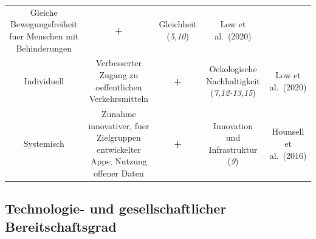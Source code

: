 \documentclass[
]{book}
\begin{document}
\begin{longtable}[]{@{}ccccc@{}}
\begin{minipage}[t]{0.16\columnwidth}
Gleiche Bewegungsfreiheit fuer Menschen mit Behinderungen\strut
\end{minipage} & \begin{minipage}[t]{0.17\columnwidth}\centering
\textbf{+}\strut
\end{minipage} & \begin{minipage}[t]{0.17\columnwidth}\centering
Gleichheit (\emph{5,10})\strut
\end{minipage} & \begin{minipage}[t]{0.17\columnwidth}\centering
Low et al.~(2020)\strut
\end{minipage}\tabularnewline
\begin{minipage}[t]{0.17\columnwidth}\centering
Individuell\strut
\end{minipage} & \begin{minipage}[t]{0.16\columnwidth}\centering
Verbesserter Zugang zu oeffentlichen Verkehrsmitteln\strut
\end{minipage} & \begin{minipage}[t]{0.17\columnwidth}\centering
\textbf{+}\strut
\end{minipage} & \begin{minipage}[t]{0.17\columnwidth}\centering
Oekologische Nachhaltigkeit (\emph{7,12-13,15})\strut
\end{minipage} & \begin{minipage}[t]{0.17\columnwidth}\centering
Low et al.~(2020)\strut
\end{minipage}\tabularnewline
\begin{minipage}[t]{0.17\columnwidth}\centering
Systemisch\strut
\end{minipage} & \begin{minipage}[t]{0.16\columnwidth}\centering
Zunahme innovativer, fuer Zielgruppen entwickelter Apps; Nutzung offener Daten\strut
\end{minipage} & \begin{minipage}[t]{0.17\columnwidth}\centering
\textbf{+}\strut
\end{minipage} & \begin{minipage}[t]{0.17\columnwidth}\centering
Innovation und Infrastruktur (\emph{9})\strut
\end{minipage} & \begin{minipage}[t]{0.17\columnwidth}\centering
Hounsell et al.~(2016)\strut
\end{minipage}\tabularnewline
\bottomrule
\end{longtable}

\hypertarget{technologie--und-gesellschaftlicher-bereitschaftsgrad-24}{%
\subsection*{Technologie- und gesellschaftlicher Bereitschaftsgrad}\label{technologie--und-gesellschaftlicher-bereitschaftsgrad-24}}
\end{document}
